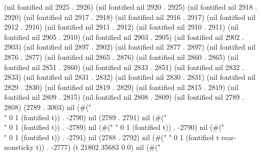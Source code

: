 (nil fontified nil 2925 . 2926) (nil fontified nil 2920 . 2925) (nil fontified nil 2918 . 2920) (nil fontified nil 2917 . 2918) (nil fontified nil 2916 . 2917) (nil fontified nil 2912 . 2916) (nil fontified nil 2911 . 2912) (nil fontified nil 2910 . 2911) (nil fontified nil 2905 . 2910) (nil fontified nil 2903 . 2905) (nil fontified nil 2902 . 2903) (nil fontified nil 2897 . 2902) (nil fontified nil 2877 . 2897) (nil fontified nil 2876 . 2877) (nil fontified nil 2865 . 2876) (nil fontified nil 2860 . 2865) (nil fontified nil 2851 . 2860) (nil fontified nil 2833 . 2851) (nil fontified nil 2832 . 2833) (nil fontified nil 2831 . 2832) (nil fontified nil 2830 . 2831) (nil fontified nil 2829 . 2830) (nil fontified nil 2819 . 2829) (nil fontified nil 2815 . 2819) (nil fontified nil 2809 . 2815) (nil fontified nil 2808 . 2809) (nil fontified nil 2789 . 2808) (2789 . 3003) nil (#("\\" 0 1 (fontified t)) . -2790) nil (2789 . 2791) nil (#("\\" 0 1 (fontified t)) . -2789) nil (#("
" 0 1 (fontified t)) . -2790) nil (#("\\" 0 1 (fontified t)) . -2791) nil (2788 . 2792) nil (#("
" 0 1 (fontified t rear-nonsticky t)) . -2777) (t 21802 35683 0 0) nil (#("%
